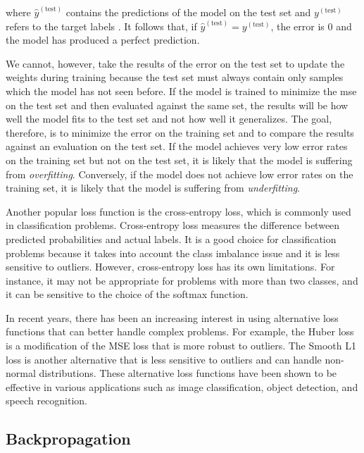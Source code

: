 \documentclass[draft,final]{vutinfth} %
\begin{document}
where $\hat{y}^{(\mathrm{test})}$ contains the predictions of the
model on the test set and $y^{(\mathrm{test})}$ refers to the target
labels \cite{goodfellow2016}. It follows that, if
$\hat{y}^{(\mathrm{test})} = y^{(\mathrm{test})}$, the error is $0$
and the model has produced a perfect prediction.

We cannot, however, take the results of the error on the test set to
update the weights during training because the test set must always
contain only samples which the model has not seen before. If the model
is trained to minimize the \gls{mse} on the test set and then
evaluated against the same set, the results will be how well the model
fits to the test set and not how well it generalizes. The goal,
therefore, is to minimize the error on the training set and to compare
the results against an evaluation on the test set. If the model
achieves very low error rates on the training set but not on the test
set, it is likely that the model is suffering from
\emph{overfitting}. Conversely, if the model does not achieve low
error rates on the training set, it is likely that the model is
suffering from \emph{underfitting}.

Another popular loss function is the cross-entropy loss, which is
commonly used in classification problems. Cross-entropy loss measures
the difference between predicted probabilities and actual labels. It
is a good choice for classification problems because it takes into
account the class imbalance issue and it is less sensitive to
outliers. However, cross-entropy loss has its own limitations. For
instance, it may not be appropriate for problems with more than two
classes, and it can be sensitive to the choice of the softmax
function.

In recent years, there has been an increasing interest in using
alternative loss functions that can better handle complex
problems. For example, the Huber loss is a modification of the MSE
loss that is more robust to outliers. The Smooth L1 loss is another
alternative that is less sensitive to outliers and can handle
non-normal distributions. These alternative loss functions have been
shown to be effective in various applications such as image
classification, object detection, and speech recognition.

\subsection{Backpropagation}
\label{ssec:theory-backpropagation}
\end{document}
